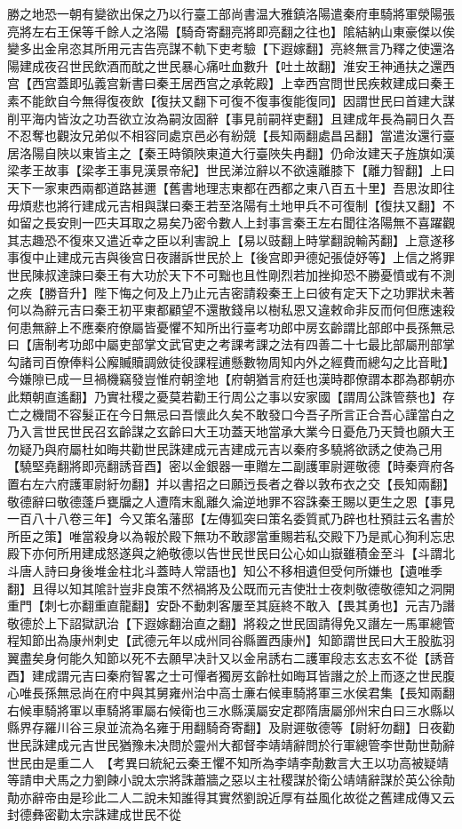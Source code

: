 勝之地恐一朝有變欲出保之乃以行臺工部尚書温大雅鎮洛陽遣秦府車騎將軍滎陽張亮將左右王保等千餘人之洛陽【騎奇寄翻亮將即亮翻之往也】隂結納山東豪傑以俟變多出金帛恣其所用元吉告亮謀不軌下吏考驗【下遐嫁翻】亮終無言乃釋之使還洛陽建成夜召世民飲酒而酖之世民暴心痛吐血數升【吐土故翻】淮安王神通扶之還西宫【西宫蓋即弘義宫新書曰秦王居西宫之承乾殿】上幸西宫問世民疾敕建成曰秦王素不能飲自今無得復夜飲【復扶又翻下可復不復事復能復同】因謂世民曰首建大謀削平海内皆汝之功吾欲立汝為嗣汝固辭【事見前嗣祥吏翻】且建成年長為嗣日久吾不忍奪也觀汝兄弟似不相容同處京邑必有紛競【長知兩翻處昌呂翻】當遣汝還行臺居洛陽自陜以東皆主之【秦王時領陜東道大行臺陜失冉翻】仍命汝建天子旌旗如漢梁孝王故事【梁孝王事見漢景帝紀】世民涕泣辭以不欲遠離膝下【離力智翻】上曰天下一家東西兩都道路甚邇【舊書地理志東都在西都之東八百五十里】吾思汝即往毋煩悲也將行建成元吉相與謀曰秦王若至洛陽有土地甲兵不可復制【復扶又翻】不如留之長安則一匹夫耳取之易矣乃密令數人上封事言秦王左右聞往洛陽無不喜躍觀其志趣恐不復來又遣近幸之臣以利害說上【易以豉翻上時掌翻說輸芮翻】上意遂移事復中止建成元吉與後宫日夜譖訴世民於上【後宫即尹德妃張偼妤等】上信之將罪世民陳叔達諫曰秦王有大功於天下不可黜也且性剛烈若加挫抑恐不勝憂憤或有不測之疾【勝音升】陛下悔之何及上乃止元吉密請殺秦王上曰彼有定天下之功罪狀未著何以為辭元吉曰秦王初平東都顧望不還散錢帛以樹私恩又違敕命非反而何但應速殺何患無辭上不應秦府僚屬皆憂懼不知所出行臺考功郎中房玄齡謂比部郎中長孫無忌曰【唐制考功郎中屬吏部掌文武官吏之考課考課之法有四善二十七最比部屬刑部掌勾諸司百僚俸料公廨贓贖調斂徒役課程逋懸數物周知内外之經費而總勾之比音毗】今嫌隙已成一旦禍機竊發豈惟府朝塗地【府朝猶言府廷也漢時郡僚謂本郡為郡朝亦此類朝直遙翻】乃實社稷之憂莫若勸王行周公之事以安家國【謂周公誅管蔡也】存亡之機間不容髮正在今日無忌曰吾懷此久矣不敢發口今吾子所言正合吾心謹當白之乃入言世民世民召玄齡謀之玄齡曰大王功蓋天地當承大業今日憂危乃天贊也願大王勿疑乃與府屬杜如晦共勸世民誅建成元吉建成元吉以秦府多驍將欲誘之使為己用【驍堅堯翻將即亮翻誘音酉】密以金銀器一車贈左二副護軍尉遲敬德【時秦齊府各置右左六府護軍尉紆勿翻】并以書招之曰願迃長者之眷以敦布衣之交【長知兩翻】敬德辭曰敬德蓬戶甕牖之人遭隋末亂離久淪逆地罪不容誅秦王賜以更生之恩【事見一百八十八卷三年】今又策名藩邸【左傳狐突曰策名委質貳乃辟也杜預註云名書於所臣之策】唯當殺身以為報於殿下無功不敢謬當重賜若私交殿下乃是貳心狥利忘忠殿下亦何所用建成怒遂與之絶敬德以告世民世民曰公心如山嶽雖積金至斗【斗謂北斗唐人詩曰身後堆金柱北斗蓋時人常語也】知公不移相遺但受何所嫌也【遺唯季翻】且得以知其隂計豈非良策不然禍將及公既而元吉使壯士夜刺敬德敬德知之洞開重門【刺七亦翻重直龍翻】安卧不動刺客屢至其庭終不敢入【畏其勇也】元吉乃譖敬德於上下詔獄訊治【下遐嫁翻治直之翻】將殺之世民固請得免又譖左一馬軍總管程知節出為康州刺史【武德元年以成州同谷縣置西康州】知節謂世民曰大王股肱羽翼盡矣身何能久知節以死不去願早决計又以金帛誘右二護軍段志玄志玄不從【誘音酉】建成謂元吉曰秦府智畧之士可憚者獨房玄齡杜如晦耳皆譖之於上而逐之世民腹心唯長孫無忌尚在府中與其舅雍州治中高士亷右候車騎將軍三水侯君集【長知兩翻右候車騎將軍以車騎將軍屬右候衛也三水縣漢屬安定郡隋唐屬邠州宋白曰三水縣以縣界存羅川谷三泉並流為名雍于用翻騎奇寄翻】及尉遲敬德等【尉紆勿翻】日夜勸世民誅建成元吉世民猶豫未决問於靈州大都督李靖靖辭問於行軍總管李世勣世勣辭世民由是重二人　【考異曰統紀云秦王懼不知所為李靖李勣數言大王以功高被疑靖等請申犬馬之力劉餗小說太宗將誅蕭牆之惡以主社稷謀於衛公靖靖辭謀於英公徐勣勣亦辭帝由是珍此二人二說未知誰得其實然劉說近厚有益風化故從之舊建成傳又云封德彝密勸太宗誅建成世民不從